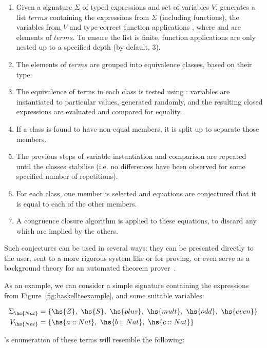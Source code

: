 \begin{enumerate}
\item Given a signature $\Sigma$ of typed expressions and set of variables $V$,
  \quickspec{} generates a list $terms$ containing the expressions from
  $\Sigma$ (including functions), the variables from $V$ and type-correct
  function applications , where  and  are elements of
  $terms$. To ensure the list is finite, function applications are only nested
  up to a specified depth (by default, 3).
\item The elements of $terms$ are grouped into equivalence classes, based on
  their type.
\item The equivalence of terms in each class is tested using \quickcheck{}:
  variables are instantiated to particular values, generated randomly, and the
  resulting closed expressions are evaluated and compared for equality.
\item If a class is found to have non-equal members, it is split up to separate
  those members.
\item The previous steps of variable instantiation and comparison are repeated
  until the classes stabilise (i.e. no differences have been observed for some
  specified number of repetitions).
\item For each class, one member is selected and equations are conjectured that
  it is equal to each of the other members.
\item A congruence closure algorithm is applied to these equations, to discard
  any which are implied by the others.
\end{enumerate}

Such conjectures can be used in several ways: they can be presented directly
to the user, sent to a more rigorous system like \hipspec{} or \hipster{} for
proving, or even serve as a background theory for an automated theorem
prover~\cite{claessen2013automating}.

As an example, we can consider a simple signature containing the expressions
from Figure~\ref{fig:haskellteexample}, and some suitable variables:

\begin{align*}
  \Sigma_{\hs{Nat}} &= \{\hs{Z},\ \hs{S},\ \hs{plus},\ \hs{mult},\ \hs{odd},
                       \ \hs{even}\} \\
  V_{\hs{Nat}}     &= \{\hs{a :: Nat},\ \hs{b :: Nat},\ \hs{c :: Nat}\}
\end{align*}

\quickspec{}'s enumeration of these terms will resemble the following:

